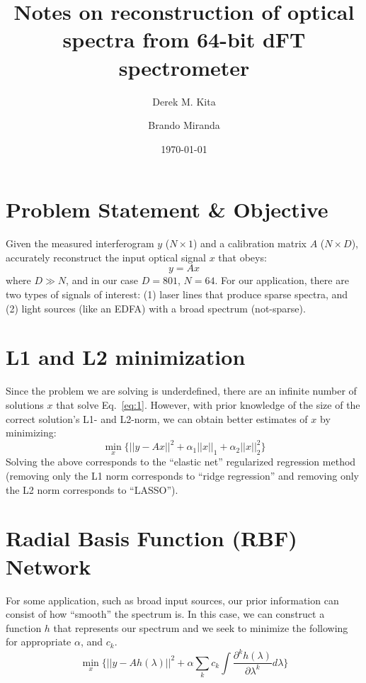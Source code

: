 \documentclass[10pt,a4paper]{article}
\title{Notes on reconstruction of optical spectra from 64-bit dFT spectrometer}
\author[1]{Derek M. Kita}
\author[2]{Brando Miranda}
\affil[1]{Department of Materials Science \& Engineering, Massachusetts Institute of Technology}
\affil[2]{Center for Brains, Minds, and Machines, Massachusetts Institute of Technology}
\date{\today}
\begin{document}
\maketitle

\section*{Problem Statement \& Objective}
Given the measured interferogram $y$ ($N\times 1$) and a calibration matrix $A$ ($N\times D$), accurately reconstruct the input optical signal $x$ that obeys:
\begin{equation}
y = Ax \label{eq:1}
\end{equation}
where $D\gg N$, and in our case $D=801$, $N=64$.  For our application, there are two types of signals of interest: (1) laser lines that produce sparse spectra, and (2) light sources (like an EDFA) with a broad spectrum (not-sparse).

\section*{L1 and L2 minimization}
Since the problem we are solving is underdefined, there are an infinite number of solutions $x$ that solve Eq.~\ref{eq:1}. However, with prior knowledge of the size of the correct solution's L1- and L2-norm, we can obtain better estimates of $x$ by minimizing:
\begin{equation}
\min_x \Big\{ ||y-Ax||^2 + \alpha_1 ||x||_1 + \alpha_2 ||x||_2^2 \Big\}
\end{equation}
Solving the above corresponds to the ``elastic net'' regularized regression method (removing only the L1 norm corresponds to ``ridge regression'' and removing only the L2 norm corresponds to ``LASSO'').

\section*{Radial Basis Function (RBF) Network}
For some application, such as broad input sources, our prior information can consist of how ``smooth'' the spectrum is.  In this case, we can construct a function $h$ that represents our spectrum and we seek to minimize the following for appropriate $\alpha$, and $c_k$.
\begin{equation}
\min_x \Big\{ ||y-A h(\lambda)||^2 + \alpha \sum_k c_k \int \frac{\partial^k h(\lambda)}{\partial \lambda^k}d\lambda \Big\}
\end{equation}
\end{document}
